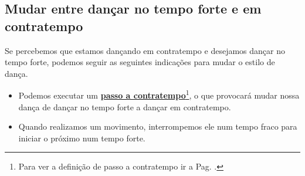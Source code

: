 \subsection{Mudar entre dançar no tempo forte e em contratempo}
Se percebemos  que estamos dançando em contratempo e desejamos dançar no tempo forte,
podemos seguir as seguintes indicações para mudar o estilo de dança.
\begin{itemize}
\item Podemos executar um \hyperref[def:PassoAContratempo]{\textbf{passo a contratempo}}\footnote{ Para 
ver a definição de passo a contratempo ir a Pag. \pageref{def:PassoAContratempo}.},
o que provocará mudar nossa dança de dançar no tempo forte a dançar em contratempo.
\begin{example}
\end{example}
\item Quando realizamos um movimento, interrompemos ele num tempo fraco 
para iniciar o próximo num tempo forte.
\begin{example}
\end{example}
\end{itemize}



